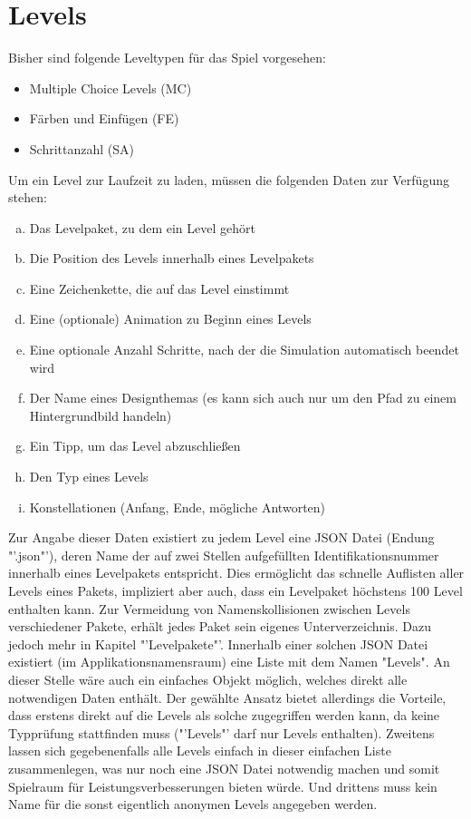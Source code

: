 \section{Levels}
Bisher sind folgende Leveltypen für das Spiel vorgesehen:
\begin{itemize}
	\item Multiple Choice Levels (MC)
	\item Färben und Einfügen (FE)
	\item Schrittanzahl (SA)
\end{itemize}
Um ein Level zur Laufzeit zu laden, müssen die folgenden Daten zur Verfügung stehen:
\begin{enumerate}[a)]
	\item Das Levelpaket, zu dem ein Level gehört
	\item Die Position des Levels innerhalb eines Levelpakets
	\item Eine Zeichenkette, die auf das Level einstimmt
	\item Eine (optionale) Animation zu Beginn eines Levels
	\item Eine optionale Anzahl Schritte, nach der die Simulation automatisch beendet wird
	\item Der Name eines Designthemas (es kann sich auch nur um den Pfad zu einem Hintergrundbild handeln)
	\item Ein Tipp, um das Level abzuschließen
	\item Den Typ eines Levels
	\item Konstellationen (Anfang, Ende, mögliche Antworten)
\end{enumerate}
Zur Angabe dieser Daten existiert zu jedem Level eine JSON Datei (Endung "'.json"'), deren Name der auf zwei Stellen aufgefüllten Identifikationsnummer innerhalb eines Levelpakets entspricht.
Dies ermöglicht das schnelle Auflisten aller Levels eines Pakets, impliziert aber auch, dass ein Levelpaket höchstens 100 Level enthalten kann.
Zur Vermeidung von Namenskollisionen zwischen Levels verschiedener Pakete, erhält jedes Paket sein eigenes Unterverzeichnis.
Dazu jedoch mehr in Kapitel "'Levelpakete"'.
Innerhalb einer solchen JSON Datei existiert (im Applikationsnamensraum) eine Liste mit dem Namen "Levels".
An dieser Stelle wäre auch ein einfaches Objekt möglich, welches direkt alle notwendigen Daten enthält.
Der gewählte Ansatz bietet allerdings die Vorteile, dass erstens direkt auf die Levels als solche zugegriffen werden kann, da keine Typprüfung stattfinden muss ("'Levels"' darf nur Levels enthalten).
Zweitens lassen sich gegebenenfalls alle Levels einfach in dieser einfachen Liste zusammenlegen, was nur noch eine JSON Datei notwendig machen und somit Spielraum für Leistungsverbesserungen bieten würde.
Und drittens muss kein Name für die sonst eigentlich anonymen Levels angegeben werden.


